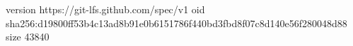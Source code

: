version https://git-lfs.github.com/spec/v1
oid sha256:d19800ff53b4c13ad8b91e0b6151786f440bd3fbd8f07c8d140e56f280048d88
size 43840
